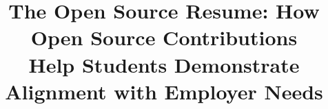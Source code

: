 \title[The Open Source Resume]{The Open Source Resume: How Open Source Contributions\\ Help Students Demonstrate Alignment with Employer Needs}